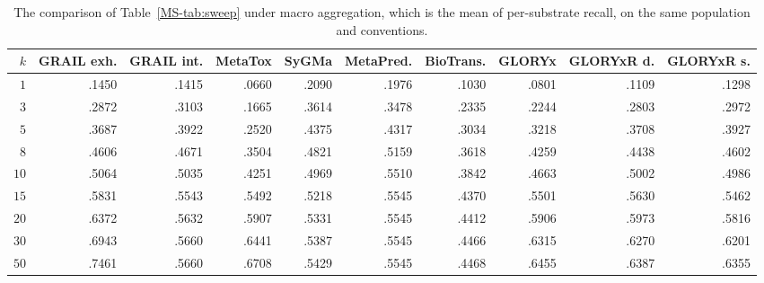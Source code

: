 \begin{table}[h]
\centering\footnotesize
\begin{threeparttable}
\caption{The comparison of Table~\ref{MS-tab:sweep} under macro aggregation, which is the mean of per-substrate recall, on the same population and conventions.}
\label{tab:si-macro}
\setlength{\tabcolsep}{1.5pt}
\begin{tabular}{rrrrrrrrrr}
\toprule
$k$ & GRAIL exh. & GRAIL int. & MetaTox & SyGMa & MetaPred. & BioTrans. & GLORYx & GLORYxR d. & GLORYxR s. \\
\midrule
$1$ & .1450 & .1415 & .0660 & .2090 & .1976 & .1030 & .0801 & .1109 & .1298 \\
$3$ & .2872 & .3103 & .1665 & .3614 & .3478 & .2335 & .2244 & .2803 & .2972 \\
$5$ & .3687 & .3922 & .2520 & .4375 & .4317 & .3034 & .3218 & .3708 & .3927 \\
$8$ & .4606 & .4671 & .3504 & .4821 & .5159 & .3618 & .4259 & .4438 & .4602 \\
$10$ & .5064 & .5035 & .4251 & .4969 & .5510 & .3842 & .4663 & .5002 & .4986 \\
$15$ & .5831 & .5543 & .5492 & .5218 & .5545 & .4370 & .5501 & .5630 & .5462 \\
$20$ & .6372 & .5632 & .5907 & .5331 & .5545 & .4412 & .5906 & .5973 & .5816 \\
$30$ & .6943 & .5660 & .6441 & .5387 & .5545 & .4466 & .6315 & .6270 & .6201 \\
$50$ & .7461 & .5660 & .6708 & .5429 & .5545 & .4468 & .6455 & .6387 & .6355 \\
\bottomrule
\end{tabular}

\vspace{4pt}


\end{threeparttable}
\end{table}
